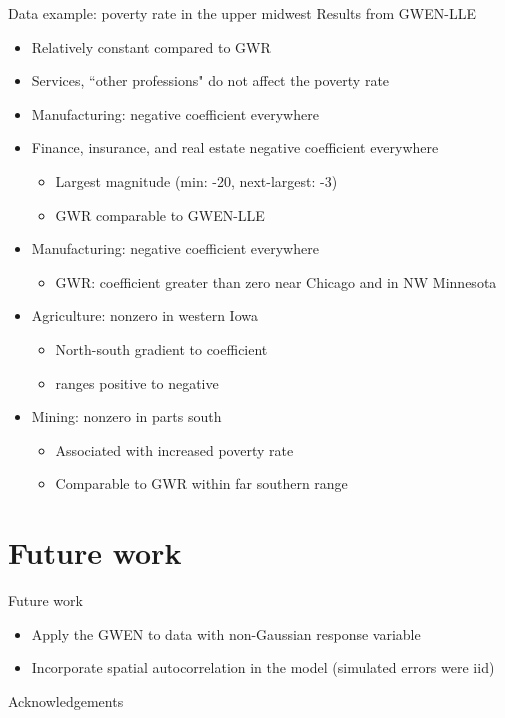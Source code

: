 \documentclass[12pt,t]{beamer}
\newcommand{\subt}[1]{{\footnotesize \color{subtitle} {#1}}}
\begin{document}
\begin{frame}{Data example: poverty rate in the upper midwest}
\subt{Results from GWEN-LLE}

\begin{itemize}
  \item Relatively constant compared to GWR
  \item Services, ``other professions" do not affect the poverty rate
  \item Manufacturing: negative coefficient everywhere
  \item Finance, insurance, and real estate negative coefficient everywhere
  \begin{itemize}
    \item Largest magnitude (min: -20, next-largest: -3)
    \item GWR comparable to GWEN-LLE
  \end{itemize}

  \item Manufacturing: negative coefficient everywhere
  \begin{itemize}
    \item GWR: coefficient greater than zero near Chicago and in NW Minnesota
  \end{itemize}

  \item Agriculture: nonzero in western Iowa
  \begin{itemize}
    \item North-south gradient to coefficient
    \item ranges positive to negative
  \end{itemize}

  \item Mining: nonzero in parts south 
  \begin{itemize}
    \item Associated with increased poverty rate
    \item Comparable to GWR within far southern range
  \end{itemize}
\end{itemize}

\end{frame}


\section{Future work}


\begin{frame}{Future work}
\begin{itemize}
    \item Apply the GWEN to data with non-Gaussian response variable
    \item Incorporate spatial autocorrelation in the model (simulated errors were iid)
\end{itemize}
\end{frame}



\begin{frame}{Acknowledgements}

\end{frame}
\end{document}
